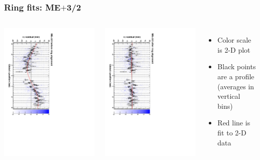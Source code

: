 \documentclass[compress]{beamer}
\begin{document}
\begin{frame}
\frametitle{Ring fits: ME$+$3/2}
\vfill
\begin{columns}
\includegraphics[height=\linewidth, angle=90]{ringfits_before/mep32.pdf}

\includegraphics[height=\linewidth, angle=90]{ringfits_after/mep32.pdf}
\begin{itemize}
\item Color scale is 2-D plot
\item Black points are a profile (averages in vertical bins)
\item Red line is fit to 2-D data
\end{itemize}
\end{columns}
\end{frame}
\end{document}

